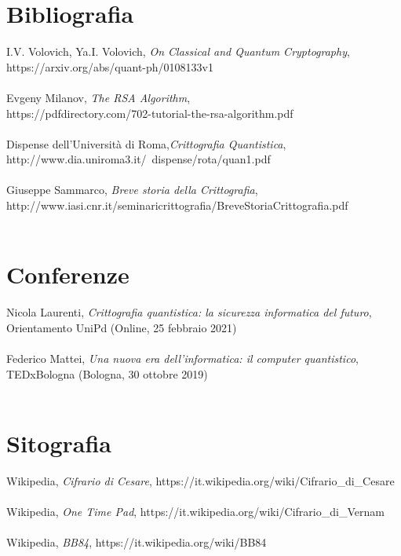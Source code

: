 \documentclass[italian,A4,12pt]{article}
\begin{document}
 \section*{Bibliografia}
 I.V. Volovich, Ya.I. Volovich, \textit{On Classical and Quantum Cryptography},\\ https://arxiv.org/abs/quant-ph/0108133v1\\\\
Evgeny Milanov, \textit{The RSA Algorithm}, \\ https://pdfdirectory.com/702-tutorial-the-rsa-algorithm.pdf\\\\
Dispense dell'Università di Roma,\textit{Crittografia Quantistica},\\http://www.dia.uniroma3.it/~dispense/rota/quan1.pdf\\\\
Giuseppe Sammarco, \textit{Breve storia della Crittografia},\\http://www.iasi.cnr.it/seminaricrittografia/BreveStoriaCrittografia.pdf\\\\
\section*{Conferenze}
Nicola Laurenti, \textit{Crittografia quantistica: la sicurezza informatica del futuro}, Orientamento UniPd (Online, 25 febbraio 2021)\\\\
Federico Mattei, \textit{Una nuova era dell’informatica: il computer quantistico}, TEDxBologna (Bologna, 30 ottobre 2019)\\\\
\section*{Sitografia}
Wikipedia, \textit{Cifrario di Cesare}, https://it.wikipedia.org/wiki/Cifrario\_di\_Cesare\\\\
Wikipedia, \textit{One Time Pad}, https://it.wikipedia.org/wiki/Cifrario\_di\_Vernam\\\\
Wikipedia, \textit{BB84}, https://it.wikipedia.org/wiki/BB84\\\\
\end{document}
